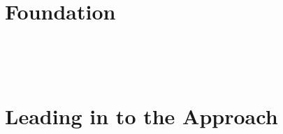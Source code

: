 \documentclass[12pt,oneside]{book}
\begin{document}
\newtheorem*{mydef}{Definition}






\newpage \ %
\part{Foundation}

%

\newpage\ 






\newpage\ %
\part{Leading in to the Approach}
\newpage\ 

\end{document}
